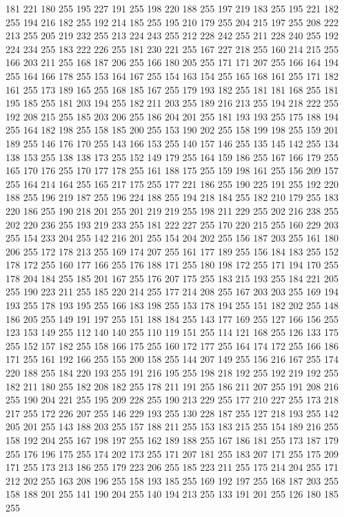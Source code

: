 181 221 180 255 195 227 191 255 198 220 188 255 197 219 183 255 195 221 182 255 194 216 182 255 192 214 185 255 195 210 179 255 204 215 197 255 208 222 213 255 205 219 232 255 213 224 243 255 212 228 242 255 211 228 240 255 192 224 234 255 183 222 226 255
181 230 221 255 167 227 218 255 160 214 215 255 166 203 211 255 168 187 206 255 166 180 205 255 171 171 207 255 166 164 194 255 164 166 178 255 153 164 167 255 154 163 154 255 165 168 161 255 171 182 161 255 173 189 165 255 168 185 167 255 179 193 182 255
181 181 168 255 181 195 185 255 181 203 194 255 182 211 203 255 189 216 213 255 194 218 222 255 192 208 215 255 185 203 206 255 186 204 201 255 181 193 193 255 175 188 194 255 164 182 198 255 158 185 200 255 153 190 202 255 158 199 198 255 159 201 189 255
146 176 170 255 143 166 153 255 140 157 146 255 135 145 142 255 134 138 153 255 138 138 173 255 152 149 179 255 164 159 186 255 167 166 179 255 165 170 176 255 170 177 178 255 161 188 175 255 159 198 161 255 156 209 157 255 164 214 164 255 165 217 175 255
177 221 186 255 190 225 191 255 192 220 188 255 196 219 187 255 196 224 188 255 194 218 184 255 182 210 179 255 183 220 186 255 190 218 201 255 201 219 219 255 198 211 229 255 202 216 238 255 202 220 236 255 193 219 233 255 181 222 227 255 170 220 215 255
160 229 203 255 154 233 204 255 142 216 201 255 154 204 202 255 156 187 203 255 161 180 206 255 172 178 213 255 169 174 207 255 161 177 189 255 156 184 183 255 152 178 172 255 160 177 166 255 176 188 171 255 180 198 172 255 171 194 170 255 178 204 184 255
185 201 167 255 176 207 175 255 183 215 193 255 184 221 205 255 190 223 211 255 185 220 214 255 177 214 208 255 167 203 203 255 169 194 193 255 178 193 195 255 166 183 198 255 153 178 194 255 151 182 202 255 148 186 205 255 149 191 197 255 151 188 184 255
143 177 169 255 127 166 156 255 123 153 149 255 112 140 140 255 110 119 151 255 114 121 168 255 126 133 175 255 152 157 182 255 158 166 175 255 160 172 177 255 164 174 172 255 166 186 171 255 161 192 166 255 155 200 158 255 144 207 149 255 156 216 167 255
174 220 188 255 184 220 193 255 191 216 195 255 198 218 192 255 192 219 192 255 182 211 180 255 182 208 182 255 178 211 191 255 186 211 207 255 191 208 216 255 190 204 221 255 195 209 228 255 190 213 229 255 177 210 227 255 173 218 217 255 172 226 207 255
146 229 193 255 130 228 187 255 127 218 193 255 142 205 201 255 143 188 203 255 157 188 211 255 153 183 215 255 154 189 216 255 158 192 204 255 167 198 197 255 162 189 188 255 167 186 181 255 173 187 179 255 176 196 175 255 174 202 173 255 171 207 181 255
183 207 171 255 175 209 171 255 173 213 186 255 179 223 206 255 185 223 211 255 175 214 204 255 171 212 202 255 163 208 196 255 158 193 185 255 169 192 197 255 168 187 203 255 158 188 201 255 141 190 204 255 140 194 213 255 133 191 201 255 126 180 185 255
